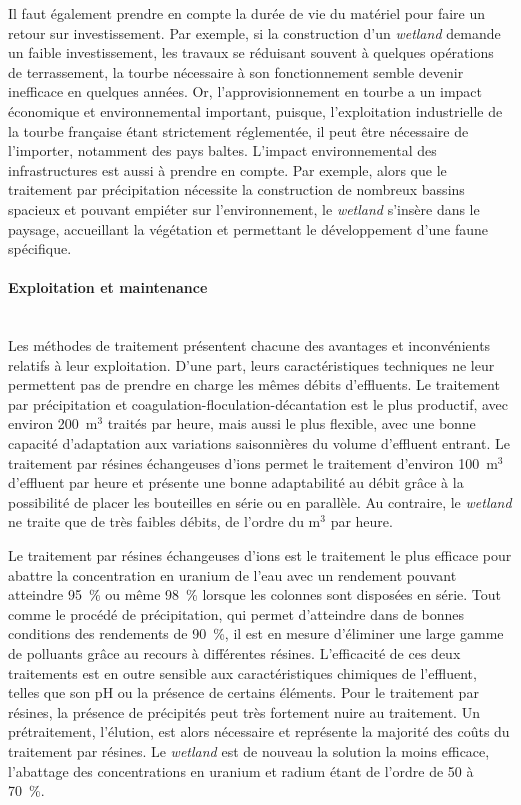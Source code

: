 \documentclass{article}
\begin{document}
Il faut également prendre en compte la durée de vie du matériel pour faire un retour sur investissement. Par exemple, si la construction d’un \textit{wetland} demande un faible investissement, les travaux se réduisant souvent à quelques opérations de terrassement, la tourbe nécessaire à son fonctionnement semble devenir inefficace en quelques années. Or, l’approvisionnement en tourbe a un impact économique et environnemental important, puisque, l’exploitation industrielle de la tourbe française étant strictement réglementée, il peut être nécessaire de l’importer, notamment des pays baltes. L’impact environnemental des infrastructures est aussi à prendre en compte. Par exemple, alors que le traitement par précipitation nécessite la construction de nombreux bassins spacieux et pouvant empiéter sur l’environnement, le \textit{wetland} s’insère dans le paysage, accueillant la végétation et permettant le développement d’une faune spécifique.

\paragraph{Exploitation et maintenance \\ \\}

Les méthodes de traitement présentent chacune des avantages et inconvénients relatifs à leur exploitation. D’une part, leurs caractéristiques techniques ne leur permettent pas de prendre en charge les mêmes débits d’effluents. Le traitement par précipitation et coagulation-floculation-décantation est le plus productif, avec environ 200~$\text{m}^3$ traités par heure, mais aussi le plus flexible, avec une bonne capacité d’adaptation aux variations saisonnières du volume d’effluent entrant. Le traitement par résines échangeuses d’ions permet le traitement d’environ 100~$\text{m}^3$ d’effluent par heure et présente une bonne adaptabilité au débit grâce à la possibilité de placer les bouteilles en série ou en parallèle. Au contraire, le \textit{wetland} ne traite que de très faibles débits, de l’ordre du $\text{m}^3$ par heure.

Le traitement par résines échangeuses d’ions est le traitement le plus efficace pour abattre la concentration en uranium de l’eau avec un rendement pouvant atteindre 95~\% ou même 98~\% lorsque les colonnes sont disposées en série.  Tout comme le procédé de précipitation, qui permet d’atteindre dans de bonnes conditions des rendements de 90~\%, il est en mesure d’éliminer une large gamme de polluants grâce au recours à différentes résines. L’efficacité de ces deux traitements est en outre sensible aux caractéristiques chimiques de l’effluent, telles que son pH ou la présence de certains éléments. Pour le traitement par résines, la présence de précipités peut très fortement nuire au traitement. Un prétraitement, l’élution, est alors nécessaire et représente la majorité des coûts du traitement par résines. Le \textit{wetland} est de nouveau la solution la moins efficace, l’abattage des concentrations en uranium et radium étant de l’ordre de 50 à 70~\%.
\end{document}
